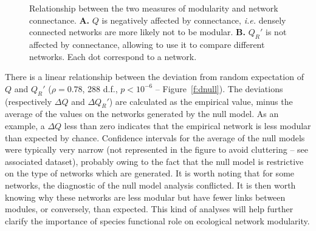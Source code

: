 \documentclass[12pt,oneside]{article}
\begin{document}
\begin{figure}[tbp]
	\begin{center}
	\end{center}
	\caption{Relationship between the two measures of modularity and network connectance. \textbf{A.} $Q$ is negatively affected by connectance, \emph{i.e.} densely connected networks are more likely not to be modular. \textbf{B.} $Q_R'$ is not affected by connectance, allowing to use it to compare different networks. Each dot correspond to a network.}
	\label{f:co}
\end{figure}

There is a linear relationship between the deviation from random expectation
of $Q$ and $Q_R'$ ($\rho = 0.78$, 288 d.f., $p < 10^{-6}$ --
Figure~\ref{f:dnull}). The deviations (respectively $\Delta Q$ and $\Delta
Q_R'$) are calculated as the empirical value, minus the average of the values
on the networks generated by the null model. As an example, a $\Delta Q$ less
than zero indicates that the empirical network is less modular than expected
by chance. Confidence intervals for the average of the null models were
typically very narrow (not represented in the figure to avoid cluttering --
see associated dataset), probably owing to the fact that the null model is
restrictive on the type of networks which are generated. It is worth noting
that for some networks, the diagnostic of the null model analysis conflicted.
It is then worth knowing why these networks are less modular but have fewer
links between modules, or conversely, than expected. This kind of analyses
will help further clarify the importance of species functional role on
ecological network modularity.
\end{document}
